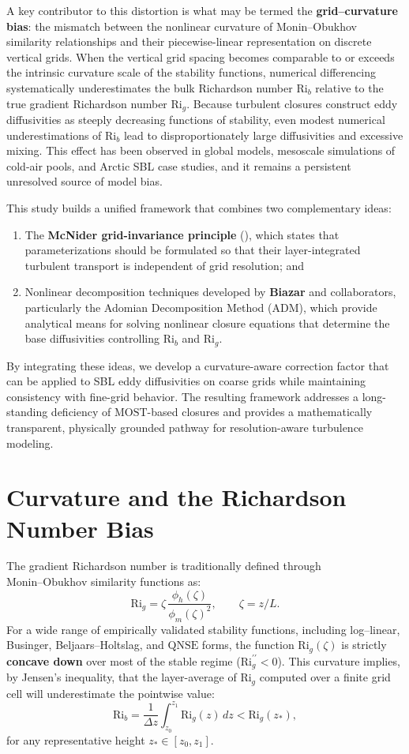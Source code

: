 \documentclass[12pt, a4paper]{article}
\begin{document}
A key contributor to this distortion is what may be termed the \textbf{grid–curvature bias}: the mismatch between the nonlinear curvature of Monin–Obukhov similarity relationships and their piecewise-linear representation on discrete vertical grids. When the vertical grid spacing becomes comparable to or exceeds the intrinsic curvature scale of the stability functions, numerical differencing systematically underestimates the bulk Richardson number $\text{Ri}_b$ relative to the true gradient Richardson number $\text{Ri}_g$. Because turbulent closures construct eddy diffusivities as steeply decreasing functions of stability, even modest numerical underestimations of $\text{Ri}_b$ lead to disproportionately large diffusivities and excessive mixing. This effect has been observed in global models, mesoscale simulations of cold-air pools, and Arctic SBL case studies, and it remains a persistent unresolved source of model bias.

This study builds a unified framework that combines two complementary ideas:
\begin{enumerate}
    \item The \textbf{McNider grid-invariance principle} (\cite{mcnider1995}), which states that parameterizations should be formulated so that their layer-integrated turbulent transport is independent of grid resolution; and
    \item Nonlinear decomposition techniques developed by \textbf{Biazar} and collaborators, particularly the Adomian Decomposition Method (ADM), which provide analytical means for solving nonlinear closure equations that determine the base diffusivities controlling $\text{Ri}_b$ and $\text{Ri}_g$.
\end{enumerate}
By integrating these ideas, we develop a curvature-aware correction factor that can be applied to SBL eddy diffusivities on coarse grids while maintaining consistency with fine-grid behavior. The resulting framework addresses a long-standing deficiency of $\text{MOST}$-based closures and provides a mathematically transparent, physically grounded pathway for resolution-aware turbulence modeling.

\section{Curvature and the Richardson Number Bias}

The gradient Richardson number is traditionally defined through $\text{Monin–Obukhov}$ similarity functions as:
$$ \text{Ri}_g = \zeta\,\frac{\phi_h(\zeta)}{\phi_m(\zeta)^2},
\qquad \zeta = z/L. $$
For a wide range of empirically validated stability functions, including log–linear, Businger, Beljaars–Holtslag, and $\text{QNSE}$ forms, the function $\text{Ri}_g(\zeta)$ is strictly \textbf{concave down} over most of the stable regime ($\text{Ri}_g^{\prime\prime} < 0$). This curvature implies, by Jensen’s inequality, that the layer-average of $\text{Ri}_g$ computed over a finite grid cell will underestimate the pointwise value:
$$ \text{Ri}_b
= \frac{1}{\Delta z}\int_{z_0}^{z_1} \text{Ri}_g(z)\,dz
< \text{Ri}_g(z_*), $$
for any representative height $z_*\in[z_0,z_1]$.
\end{document}
